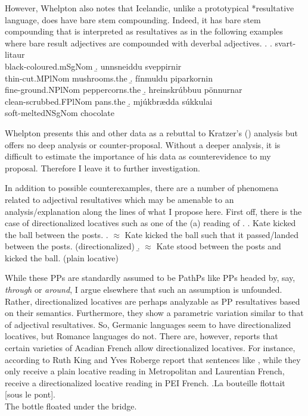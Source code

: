 However, Whelpton also notes that Icelandic, unlike a prototypical *resultative	language, does have bare stem compounding.
Indeed, it has bare stem compounding that is interpreted as resultatives as in the following examples where bare result adjectives are compounded with deverbal adjectives.
\ex. 
\a. svart-lita\dh{}ur\\
black-coloured.mSgNom
\b. \th{}unnsneiddu sveppirnir\\
thin-cut.MPlNom mushrooms.the
\b. f\'{i}nmuldu piparkornin\\
fine-ground.NPlNom peppercorns.the
\b. hreinskr\'{u}bbu\dh{}u p\"{o}nnurnar\\
clean-scrubbed.FPlNom pans.the
\b. mj\'{u}kbr\ae{}dda s\'{u}kkula\dh{}i\\
soft-meltedNSgNom chocolate

Whelpton presents this and other data as a rebuttal to Kratzer's (\citeyear{kratzer2004building}) analysis but offers no deep analysis or counter-proposal.
Without a deeper analysis, it is difficult to estimate the importance of his data as counterevidence to my proposal.
Therefore I leave it to further investigation.

In addition to possible counterexamples, there are a number of phenomena related to adjectival resultatives which may be amenable to an analysis/explanation along the lines of what I propose here.
First off, there is the case of directionalized locatives such as one of the (a) reading of \Next.
\ex. Kate kicked the ball between the posts.
\a. $\approx$ Kate kicked the ball such that it passed/landed between the posts. (directionalized)
\b. $\approx$ Kate stood between the posts and kicked the ball. (plain locative)

While these PPs are standardly assumed to be PathPs like PPs headed by, say, \textit{through} or \textit{around}, I argue elsewhere \parencite{milway20xxmodifying} that such an assumption is unfounded.
Rather, directionalized locatives are perhaps analyzable as PP resultatives based on their semantics.
Furthermore, they show a parametric variation similar to that of adjectival resultatives.
So, Germanic languages seem to have directionalized locatives, but Romance languages do not.
There are, however, reports that certain varieties of Acadian French allow directionalized locatives.
For instance, according to Ruth King and Yves Roberge \parencite[p.c. cited in][253--254]{rooryck1996prepositions} report that sentences like \Next, while they only receive a plain locative reading in Metropolitan and Laurentian French, receive a directionalized locative reading in PEI French.
\ex.La bouteille flottait [sous le pont].\\
The bottle floated under the bridge. \parencite{rooryck1996prepositions}


